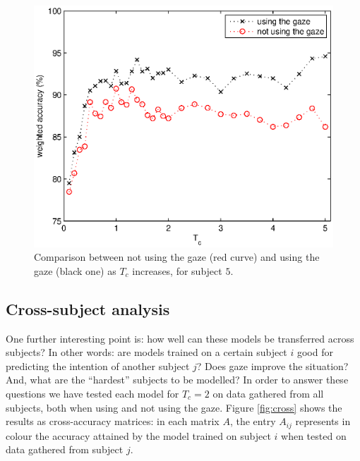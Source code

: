 \documentclass[jou,a4paper,notxfonts]{apa}
\begin{document}
\begin{figure}[!ht]
  \centering
    \includegraphics[width=\linewidth]{figs/mama.eps}
    \caption{Comparison between not using the gaze (red curve) and
    using the gaze (black one) as $T_c$ increases, for subject $5$.}
    \label{fig:mama}
\end{figure}

\subsection{Cross-subject analysis}

One further interesting point is: how well can these models be
transferred across subjects? In other words: are models trained on a
certain subject $i$ good for predicting the intention of another
subject $j$? Does gaze improve the situation? And, what are the
``hardest'' subjects to be modelled? In order to answer these
questions we have tested each model for $T_c=2$ on data gathered from
all subjects, both when using and not using the gaze. Figure
\ref{fig:cross} shows the results as cross-accuracy matrices: in each
matrix $A$, the entry $A_{ij}$ represents in colour the accuracy
attained by the model trained on subject $i$ when tested on data
gathered from subject $j$.
\end{document}
